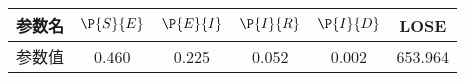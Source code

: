 \begin{tabular}{cccccc}
\hline
参数名&$\P{S}{E}$&$\P{E}{I}$&$\P{I}{R}$&$\P{I}{D}$&LOSE\\
\hline
参数值&0.460&0.225&0.052&0.002&653.964\\
\hline
\end{tabular}